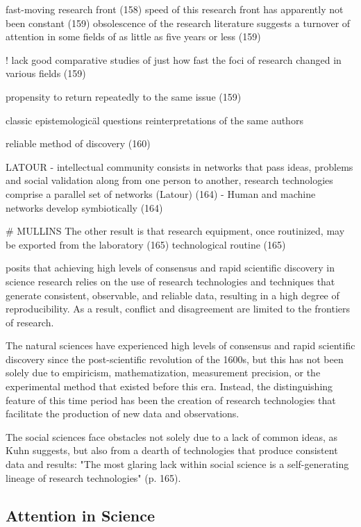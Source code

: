 fast-moving research front (158)
speed of this research front has apparently not been constant (159)
obsolescence of the research literature suggests a turnover of attention in some fields of as little as five years or less (159)

! lack good comparative studies of just how fast the foci of research changed in various fields (159)

propensity to return repeatedly to the same issue (159)

classic epistemologicäl questions
reinterpretations of the same authors

reliable method of discovery (160)

LATOUR
- intellectual community consists in networks that pass ideas, problems and social validation along from one person to another, research technologies comprise a parallel set of networks (Latour) (164)
- Human and machine networks develop symbiotically (164)

# MULLINS
The other result is that research equipment, once routinized, may be exported from the laboratory (165)
technological routine (165)

\cite{collins1994} posits that achieving high levels of consensus and rapid scientific discovery in science research relies on the use of research technologies and techniques that generate consistent, observable, and reliable data, resulting in a high degree of reproducibility. As a result, conflict and disagreement are limited to the frontiers of research. 

The natural sciences have experienced high levels of consensus and rapid scientific discovery since the post-scientific revolution of the 1600s, but this has not been solely due to empiricism, mathematization, measurement precision, or the experimental method that existed before this era. Instead, the distinguishing feature of this time period has been the creation of research technologies that facilitate the production of new data and observations.

The social sciences face obstacles not solely due to a lack of common ideas, as Kuhn suggests, but also from a dearth of technologies that produce consistent data and results: "The most glaring lack within social science is a self-generating lineage of research technologies" (p. 165).

\subsection{Attention in Science}

